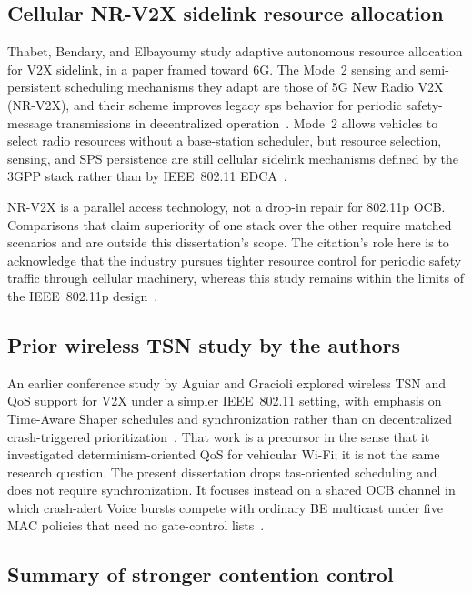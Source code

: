 \subsection{Cellular NR-V2X sidelink resource allocation}
\label{sec:rw:nrv2x}

Thabet, Bendary, and Elbayoumy study adaptive autonomous resource allocation for V2X sidelink, in a paper framed toward 6G.
The Mode~2 sensing and semi-persistent scheduling mechanisms they adapt are those of 5G New Radio V2X (NR-V2X), and their scheme improves legacy \gls{sps} behavior for periodic safety-message transmissions in decentralized operation~\cite{CV2X_Sidelink_Allocation}.
Mode~2 allows vehicles to select radio resources without a base-station scheduler, but resource selection, sensing, and SPS persistence are still cellular sidelink mechanisms defined by the 3GPP stack rather than by IEEE~802.11 EDCA~\cite{CV2X_Sidelink_Allocation}.

NR-V2X is a parallel access technology, not a drop-in repair for 802.11p OCB.
Comparisons that claim superiority of one stack over the other require matched scenarios and are outside this dissertation's scope.
The citation's role here is to acknowledge that the industry pursues tighter resource control for periodic safety traffic through cellular machinery, whereas this study remains within the limits of the IEEE~802.11p design~\cite{jiang2008ieee80211p,CV2X_Sidelink_Allocation}.

\subsection{Prior wireless TSN study by the authors}
\label{sec:rw:prior}

An earlier conference study by Aguiar and Gracioli explored wireless TSN and QoS support for V2X under a simpler IEEE~802.11 setting, with emphasis on Time-Aware Shaper schedules and synchronization rather than on decentralized crash-triggered prioritization~\cite{11288825}.
That work is a precursor in the sense that it investigated determinism-oriented QoS for vehicular Wi-Fi; it is not the same research question.
The present dissertation drops \gls{tas}-oriented scheduling and does not require synchronization.
It focuses instead on a shared OCB channel in which crash-alert Voice bursts compete with ordinary BE multicast under five MAC policies that need no gate-control lists~\cite{11288825}.

\subsection{Summary of stronger contention control}
\label{sec:rw:stronger-synth}

